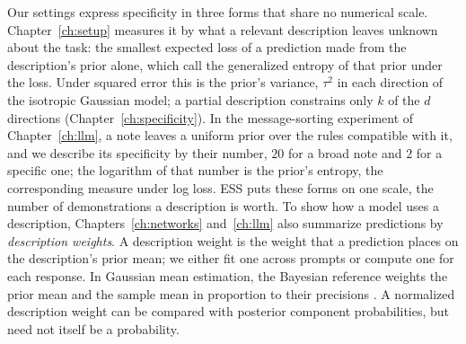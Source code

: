 Our settings express specificity in three forms that share no numerical scale. Chapter~\ref{ch:setup} measures it by what a relevant description leaves unknown about the task: the smallest expected loss of a prediction made from the description's prior alone, which \citet{grunwald2004} call the generalized entropy of that prior under the loss. Under squared error this is the prior's variance, $\tau^2$ in each direction of the isotropic Gaussian model; a partial description constrains only $k$ of the $d$ directions (Chapter~\ref{ch:specificity}). In the message-sorting experiment of Chapter~\ref{ch:llm}, a note leaves a uniform prior over the rules compatible with it, and we describe its specificity by their number, $20$ for a broad note and $2$ for a specific one; the logarithm of that number is the prior's entropy, the corresponding measure under log loss. ESS puts these forms on one scale, the number of demonstrations a description is worth. To show how a model uses a description, Chapters~\ref{ch:networks} and~\ref{ch:llm} also summarize predictions by \emph{description weights}. A description weight is the weight that a prediction places on the description's prior mean; we either fit one across prompts or compute one for each response. In Gaussian mean estimation, the Bayesian reference weights the prior mean and the sample mean in proportion to their precisions \citep{neuenschwander2020}. A normalized description weight can be compared with posterior component probabilities, but need not itself be a probability.
